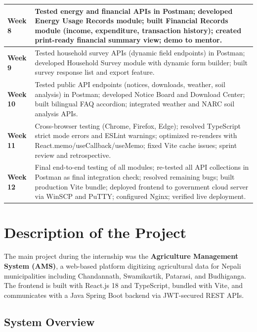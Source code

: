 \documentclass[12pt,a4paper]{report}
\begin{document}
\begin{longtable}{|p{2.8cm}|p{11cm}|}
\textbf{Week 8}
 &
Tested energy and financial APIs in Postman;
developed Energy Usage Records module;
built Financial Records module (income, expenditure, transaction history);
created print-ready financial summary view; demo to mentor. \\
\hline

\textbf{Week 9}
 &
Tested household survey APIs (dynamic field endpoints) in Postman;
developed Household Survey module with dynamic form builder;
built survey response list and export feature. \\
\hline

\textbf{Week 10}
 &
Tested public API endpoints (notices, downloads, weather, soil analysis) in Postman;
developed Notice Board and Download Center;
built bilingual FAQ accordion; integrated weather and NARC soil analysis APIs. \\
\hline

\textbf{Week 11}
 &
Cross-browser testing (Chrome, Firefox, Edge);
resolved TypeScript strict mode errors and ESLint warnings;
optimized re-renders with React.memo/useCallback/useMemo;
fixed Vite cache issues; sprint review and retrospective. \\
\hline

\textbf{Week 12}
&
Final end-to-end testing of all modules;
re-tested all API collections in Postman as final integration check;
resolved remaining bugs; built production Vite bundle; deployed frontend to
government cloud server via WinSCP and PuTTY; configured Nginx; verified live deployment. \\
\hline

\end{longtable}

\section{Description of the Project}

The main project during the internship was the \textbf{Agriculture Management System
(AMS)}, a web-based platform digitizing agricultural data for Nepali municipalities
including Chandannath, Swamikartik, Patarasi, and Budhiganga. The frontend is built
with React.js 18 and TypeScript, bundled with Vite, and communicates with a Java
Spring Boot backend via JWT-secured REST APIs.

\subsection{System Overview}
\end{document}
